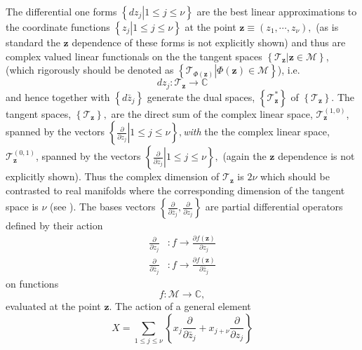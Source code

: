 \documentclass[aps,preprint]{revtex4}%
\begin{document}
The differential one forms $\left\{  \left.  dz_{j}\right\vert 1\leq j\leq
\nu\right\}  $ are the best linear approximations to the coordinate functions
$\left\{  \left.  z_{j}\right\vert 1\leq j\leq\nu\right\}  $ at the point
$\mathbf{z}\equiv\left(  z_{1},\cdots,z_{\nu}\right)  ,$ (as is standard the
$\mathbf{z}$ dependence of these forms is not explicitly shown) and thus are
complex valued linear functionals on the the tangent spaces $\left\{  \left.
\mathcal{T}_{\mathbf{z}}\right\vert \mathbf{z\in}\mathcal{M}\right\}  $,
(which rigorously should be denoted as $\left\{  \left.  \mathcal{T}%
_{\Phi\left(  \mathbf{z}\right)  }\right\vert \Phi\left(  \mathbf{z}\right)
\mathbf{\in}\mathcal{M}\right\}  $), i.e.
\begin{equation}
dz_{j}:\mathcal{T}_{\mathbf{z}}\rightarrow\mathbb{C}%
\end{equation}
and hence together with $\left\{  d\bar{z}_{j}\right\}  $ generate the dual
spaces, $\left\{  \mathcal{T}_{\mathbf{z}}^{\ast}\right\}  $ of $\left\{
\mathcal{T}_{\mathbf{z}}\right\}  $. The tangent spaces, $\left\{
\mathcal{T}_{\mathbf{z}}\right\}  ,$ are the direct sum of the complex linear
space, $\mathcal{T}_{\mathbf{z}}^{\left(  1,0\right)  }$, spanned by the
vectors $\left\{  \left.  \frac{\partial}{\partial z_{j}}\right\vert 1\leq
j\leq\nu\right\}  ,$\emph{with} the the complex linear space, $\mathcal{T}%
_{\mathbf{z}}^{\left(  0,1\right)  }$, spanned by the vectors $\left\{
\left.  \frac{\partial}{\partial\bar{z}_{j}}\right\vert 1\leq j\leq
\nu\right\}  ,$ (again the $\mathbf{z}$ dependence is not explicitly shown).
Thus the complex dimension of $\mathcal{T}_{\mathbf{z}}$ is $2\nu$ which
should be contrasted to real manifolds where the corresponding dimension of
the tangent space is $\nu$ (see \cite{Helgason}). The bases vectors $\left\{
\frac{\partial}{\partial\bar{z}_{j}},\frac{\partial}{\partial z_{j}}\right\}
$ are partial differential operators defined by their action
\begin{align}
\frac{\partial}{\partial z_{j}}  &  :f\rightarrow\frac{\partial f\left(
\mathbf{z}\right)  }{\partial z_{j}}\nonumber\\
\frac{\partial}{\partial\bar{z}_{j}}  &  :f\rightarrow\frac{\partial f\left(
\mathbf{z}\right)  }{\partial\bar{z}_{j}}%
\end{align}
on functions%
\begin{equation}
f:\mathcal{M}\rightarrow\mathbb{C},
\end{equation}
evaluated at the point $\mathbf{z}$. The action of a general element
\begin{equation}
X=\sum_{1\leq j\leq\nu}\left\{  x_{j}\frac{\partial}{\partial\bar{z}_{j}%
}+x_{j+\nu}\frac{\partial}{\partial z_{j}}\right\}
\end{equation}
\end{document}
